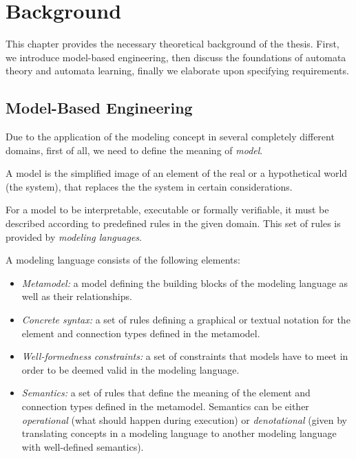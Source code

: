 \chapter{Background} \label{background}
This chapter provides the necessary theoretical background of the thesis. First, we introduce model-based engineering, then discuss the foundations of automata theory and automata learning, finally we elaborate upon specifying requirements.
\section{Model-Based Engineering} \label{sec_backgrmbe}
Due to the application of the modeling concept in several completely different domains, first of all, we need to define the meaning of \textit{model}.
\begin{definition}[Model]
	A model is the simplified image of an element of the real or a hypothetical world (the system), that replaces the the system in certain considerations.
\end{definition}

For a model to be interpretable, executable or formally verifiable, it must be described according to predefined rules in the given domain. This set of rules is provided by \textit{modeling languages}.
\begin{definition}
	A modeling language consists of the following elements:
	\begin{itemize}
		\item \emph{Metamodel:} a model defining the building blocks of the modeling language as well
		as their relationships.
		\item \emph{Concrete syntax:} a set of rules defining a graphical or textual notation for the
		element and connection types defined in the metamodel.
		\item \emph{Well-formedness constraints:} a set of constraints that models have to meet in order
		to be deemed valid in the modeling language.
		\item \emph{Semantics:} a set of rules that define the meaning of the element and connection
		types defined in the metamodel. Semantics can be either \textit{operational} (what should happen during execution) or \textit{denotational} (given by translating concepts in a modeling language to another modeling language with well-defined semantics).
	\end{itemize}
\end{definition}

